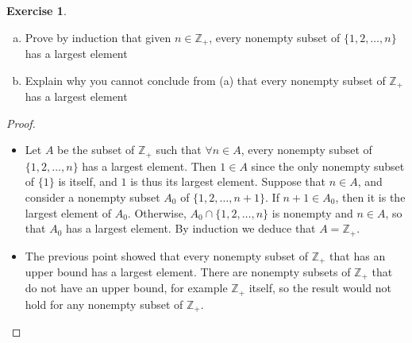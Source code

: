 \documentclass[11pt,a4paper,twoside]{article}
\theoremstyle{definition}
\newcounter{excounter}
\newtheorem{exercise}[excounter]{Exercise}
\begin{document}
\begin{exercise}\hfill

  \begin{enumerate}[(a)]

  \item Prove by induction that given $n \in \mathbb{Z}_+$, every nonempty subset of $\{ 1, 2, \dotsc, n \}$ has a largest element
  \item Explain why you cannot conclude from (a) that every nonempty subset of $\mathbb{Z}_+$ has a largest element

  \end{enumerate}

\end{exercise}

\begin{proof}\hfill

  \begin{itemize}[(a)]

  \item Let $A$ be the subset of $\mathbb{Z}_+$ such that $\forall n \in A$, every nonempty subset of $\{ 1, 2, \dotsc, n \}$ has a largest element.
    Then $1 \in A$ since the only nonempty subset of $\{ 1 \}$ is itself, and $1$ is thus its largest element. Suppose that $n \in A$, and consider
    a nonempty subset $A_0$ of $\{ 1, 2, \dotsc, n + 1 \}$. If $n + 1 \in A_0$, then it is the largest element of $A_0$.
    Otherwise, $A_0 \cap \{ 1, 2, \dotsc, n \}$ is nonempty and $n \in A$, so that $A_0$ has a largest element.
    By induction we deduce that $A = \mathbb{Z}_+$.

  \item The previous point showed that every nonempty subset of $\mathbb{Z}_+$ that has an upper bound has a largest element.
    There are nonempty subsets of $\mathbb{Z}_+$ that do not have an upper bound, for example $\mathbb{Z}_+$ itself, so the result would not hold
    for any nonempty subset of $\mathbb{Z}_+$. \qedhere

  \end{itemize}

\end{proof}
\end{document}

